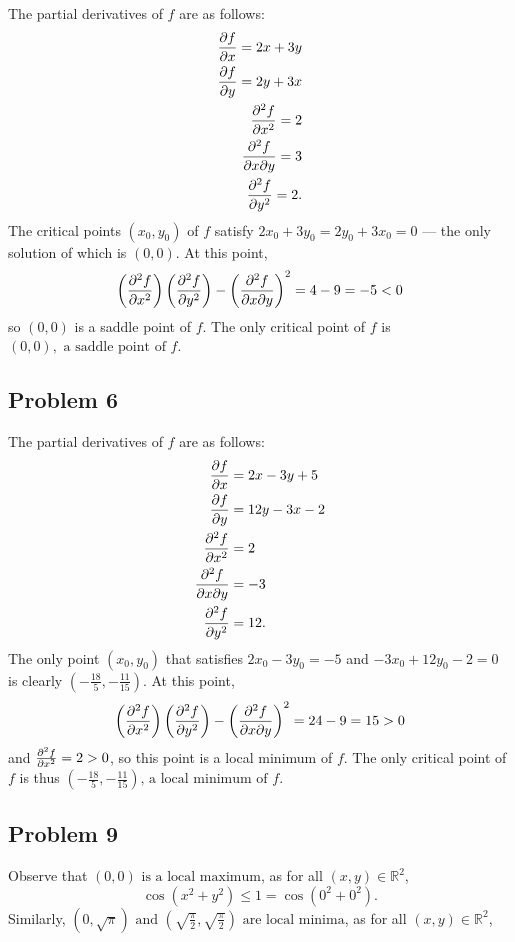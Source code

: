 \documentclass[11pt]{article}
\begin{document}
The partial derivatives of $f$ are as follows:
\begin{align*}
	\pdv{f}{x} = 2x + 3y \\
	\pdv{f}{y} = 2y + 3x \\
	\pdv[2]{f}{x} = 2 \\
	\pdv[2]{f}{x}{y} = 3 \\
	\pdv[2]{f}{y} = 2.
\end{align*}
The critical points $(x_{0}, y_{0})$ of $f$ satisfy $2x_{0} + 3y_{0} = 2y_{0} + 3x_{0} = 0$ --- the only solution of which is $(0, 0)$. At this point,
\[
	\left( \pdv[2]{f}{x} \right) \left( \pdv[2]{f}{y} \right) - \left( \pdv[2]{f}{x}{y} \right)^{2} = 4 - 9 = -5 < 0
\]
so $(0, 0)$ is a saddle point of $f$. The only critical point of $f$ is $\boxed{(0, 0), \text{ a saddle point of }f}$.


\subsection{Problem 6}

The partial derivatives of $f$ are as follows:
\begin{align*}
	\pdv{f}{x} &= 2x - 3y + 5 \\
	\pdv{f}{y} &= 12y - 3x - 2 \\
	\pdv[2]{f}{x} &= 2 \\
	\pdv[2]{f}{x}{y} &= -3 \\
	\pdv[2]{f}{y} &= 12.
\end{align*}
The only point $(x_{0}, y_{0})$ that satisfies $2x_{0} - 3y_{0} = -5$ and $-3x_{0} + 12y_{0} - 2 = 0$ is clearly $(-\frac{18}{5}, -\tfrac{11}{15})$. At this point,
\[
	\left( \pdv[2]{f}{x} \right) \left( \pdv[2]{f}{y} \right) - \left( \pdv[2]{f}{x}{y} \right)^{2} = 24 - 9 = 15 > 0
\]
and $\pdv[2]{f}{x} = 2 > 0$, so this point is a local minimum of $f$. The only critical point of $f$ is thus $\boxed{\text{$(-\tfrac{18}{5}, -\tfrac{11}{15})$, a local minimum of $f$.}}$


\subsection{Problem 9}

Observe that $\boxed{\text{$(0, 0)$ is a local maximum}}$, as for all $(x, y) \in \mathbb{R}^{2}$,
\[
	\cos(x^{2} + y^{2}) \le 1 = \cos(0^{2} + 0^{2}).
\]
Similarly, $\boxed{\text{$(0, \sqrt{\pi})$ and $\left( \sqrt{\tfrac{\pi}{2}}, \sqrt{\tfrac{\pi}{2}} \right)$ are local minima}}$, as for all $(x, y) \in \mathbb{R}^{2}$,
\end{document}
